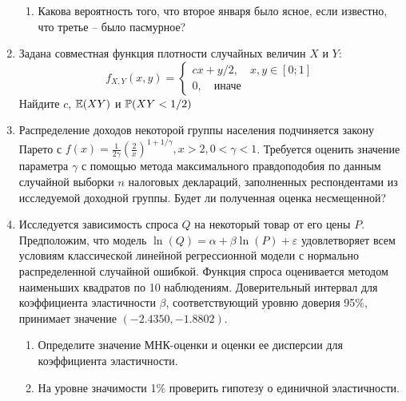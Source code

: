 \documentclass[pdftex,12pt,a4paper]{article}
\begin{document}
\begin{enumerate}
\begin{enumerate}
\item Какова вероятность того, что второе января было ясное, если известно, что третье -- было пасмурное?
\end{enumerate}
\item Задана совместная функция плотности случайных величин $X$ и $Y$:
\begin{equation}
f_{X,Y}(x,y)=\left\{\begin{array}{c}
cx+y/2,\quad x,y\in [0;1] \\ 
0,\quad \mbox{иначе}
\end{array}  \right.
\end{equation}
Найдите $c$, $\E(XY)$ и $\P(XY<1/2)$
\item Распределение доходов некоторой группы населения подчиняется закону Парето с $f(x)=\frac{1}{2\gamma}\left(\frac{2}{x}\right)^{1+1/\gamma}, x>2, 0<\gamma<1$.
Требуется оценить значение параметра $\gamma$ с помощью метода максимального правдоподобия по данным случайной выборки $n$ налоговых деклараций, заполненных респондентами из исследуемой доходной группы. Будет ли полученная оценка несмещенной?
\item Исследуется зависимость спроса $Q$ на некоторый товар от его цены $P$. Предположим, что модель $\ln(Q)=\alpha+\beta\ln(P)+\varepsilon$ удовлетворяет всем условиям классической линейной регрессионной модели с нормально распределенной случайной ошибкой. Функция спроса оценивается методом наименьших квадратов по 10 наблюдениям. Доверительный интервал для коэффициента эластичности $\beta$, соответствующий уровню доверия 95\%, принимает значение $(-2.4350,-1.8802)$. 
\begin{enumerate}
\item Определите значение МНК-оценки и оценки ее дисперсии для коэффициента эластичности.
\item На уровне значимости 1\% проверить гипотезу о единичной эластичности.
\end{enumerate}
\end{enumerate} 
\end{document}
